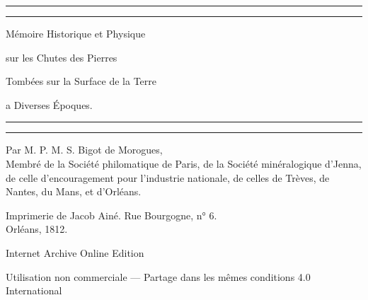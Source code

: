 \documentclass[a4paper, 12pt, oneside, french]{article}
\begin{document}
\begin{titlepage} %
	\centering %
	\scshape %

	
	\rule{\textwidth}{1.6pt}\vspace*{-\baselineskip}\vspace*{2pt} %
	\rule{\textwidth}{0.4pt} %
	
	\vspace{1.5\baselineskip} %
	
	{\LARGE Mémoire Historique et Physique}

	\vspace{1.2\baselineskip}

	{\LARGE sur les Chutes des Pierres}

 	\vspace{1.2\baselineskip}

	{\LARGE Tombées sur la Surface de la Terre}

 	\vspace{1.2\baselineskip}

	{\LARGE a Diverses Époques.}
 
	\vspace{1\baselineskip} %

	\rule{\textwidth}{0.4pt}\vspace*{-\baselineskip}\vspace{3.2pt} %
	\rule{\textwidth}{1.6pt} %
	
	\vspace{1\baselineskip} %
	
	
	{Par M. P. M. S. Bigot de Morogues,\\ \footnotesize{Membré de la Société philomatique de Paris, de la Société minéralogique d'Jenna, de celle d'encouragement pour l'industrie nationale, de celles de Trèves, de Nantes, du Mans, et d'Orléans.}} %
	
	\vspace*{1\baselineskip} %
	
    \vspace*{\fill}

	{\small\scshape }

    {Imprimerie de Jacob Ainé. Rue Bourgogne, n° 6.\\ Orléans, 1812.} %
    
    Internet Archive Online Edition  %
	
	{Utilisation non commerciale --- Partage dans les mêmes conditions 4.0 International} %
\end{titlepage}
\end{document}

